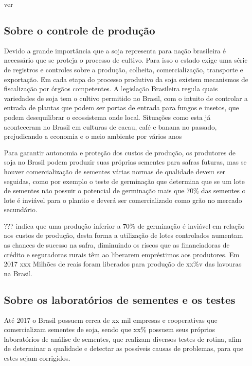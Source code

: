 ver \cite{Junior2017} \cite{LIMA2013} 

\subsection{Sobre o controle de produção}
Devido a grande importância que a soja representa para nação brasileira é necessário que se proteja o processo de cultivo. Para isso o estado exige uma série de registros e controles sobre a produção, colheita, comercialização, transporte e exportação. Em cada etapa do processo produtivo da soja existem mecanismos de fiscalização por órgãos competentes.
A legislação Brasileira regula quais variedades de soja tem o cultivo permitido no Brasil, com o intuito de controlar a entrada de plantas que podem ser portas de entrada para fungos e insetos, que podem desequilibrar o ecossistema onde local. Situações como esta já aconteceram no Brasil em culturas de cacau, café e banana no passado, prejudicando a economia e o meio ambiente por vários anos

Para garantir autonomia e proteção dos custos de produção, os produtores de soja no Brasil podem produzir suas próprias sementes para safras futuras, mas se houver comercialização de sementes várias normas de qualidade devem ser seguidas, como por exemplo o teste de germinação que determina que se um lote de sementes não possuir o potencial de germinação mais que 70\% das sementes o lote é inviável para o plantio e deverá ser comercializado como grão no mercado secundário.

??? indica que uma produção inferior a 70\% de germinação é inviável em relação aos custos de produção, desta forma a utilização de lotes controlados aumentam as chances de sucesso na safra, diminuindo os riscos que as financiadoras de crédito e seguradoras rurais têm ao liberarem empréstimos aos produtores. Em 2017 xxx Milhões de reais foram liberados para produção de xx\%v das lavouras na Brasil.

\subsection{Sobre os laboratórios de sementes e os testes}
Até 2017 o Brasil possuem cerca de xx mil empresas e cooperativas que comercializam sementes de soja, sendo que xx\% possuem seus próprios laboratórios de análise de sementes, que realizam diversos testes de rotina, afim de determinar a qualidade e detectar as possíveis causas de problemas, para que estes sejam corrigidos. 

